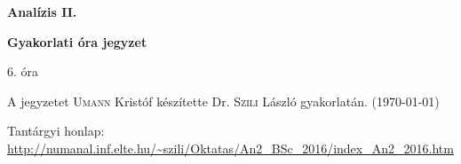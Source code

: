 \documentclass[a4paper,11.5pt]{article}
\begin{document}
	\setlength\parindent{0pt}
	\def\s{\hspace{0.2mm}\vphantom{\beta}}
	\def\Z{\mathbb{Z}}
	\def\Q{\mathbb{Q}}
	\def\R{\mathbb{R}}
	\def\C{\mathbb{C}}
	\def\N{\mathbb{N}}
	\def\Rn{\mathbb{R}^{n}}
	\def\Ra{\overline{\mathbb{R}}}
	\def\sume{\displaystyle\sum_{n=1}^{+\infty}}
	\def\sumn{\displaystyle\sum_{n=0}^{+\infty}}
	\def\biz{\emph{Bizonyítás:\ }}
	\def\narrow{\underset{n\rightarrow+\infty}{\longrightarrow}}
	\def\limn{\displaystyle\lim_{n\to +\infty}}
	\def\limx{\displaystyle\lim_{x\to +\infty}}
	
	\theoremstyle{definition}
	\newtheorem{theorem}{Tétel}[subsection] %
	
	\theoremstyle{definition}
	\newtheorem{definition}[theorem]{Definíció} %
	\newtheorem{example}[theorem]{Példa} %
	\newtheorem{task}[theorem]{Feladat} %
	\newtheorem{note}[theorem]{Megjegyzés} %
	\newtheorem{revision}[theorem]{Emlékeztető} %
	\begin{center}
		{\LARGE \textbf{Analízis II.}}
		
		{\large \textbf{Gyakorlati óra jegyzet}}
		
		6. óra
	\end{center}
	A jegyzetet \textsc{Umann} Kristóf készítette Dr. \textsc{Szili} László gyakorlatán. (\today)
	
	Tantárgyi honlap: \url{http://numanal.inf.elte.hu/~szili/Oktatas/An2_BSc_2016/index_An2_2016.htm}
	
\end{document}

